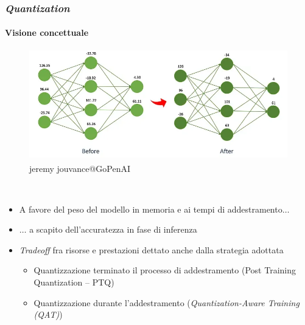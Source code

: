 %
\begin{frame}[t] \frametitle{\emph{Quantization}}
\framesubtitle{Visione concettuale}
{\scriptsize
{}
    \begin{minipage}[t]{\textwidth}
        \vspace*{-.3cm}
        \begin{figure}
            \centering
            \includegraphics[width=.8\textwidth]{img/quantization_concept_no_bg.png}
            \\\textsuperscript{\textcopyright}jeremy jouvance@GoPenAI
        \end{figure}
    \end{minipage}
    \\\vspace*{.3cm}
    \begin{minipage}[t]{\textwidth}
        \begin{itemize}[leftmargin=10pt,align=right]
            \item[\alert{\faArrowCircleRight}] A favore del peso del modello in memoria e ai tempi di addestramento$\ldots$
            \item[\alert{\faArrowCircleRight}] $\ldots$ a scapito dell'accuratezza in fase di inferenza
            \item[\alert{\faArrowCircleRight}]\emph{Tradeoff} fra risorse e prestazioni dettato anche dalla strategia adottata
            \begin{itemize}[leftmargin=10pt,align=right]
                \item[\alert{\faArrowCircleRight}] Quantizzazione terminato il processo di addestramento (\alert{P}ost \alert{T}raining \alert{Q}uantization -- PTQ)
                \item[\alert{\faArrowCircleRight}] Quantizzazione durante l'addestramento (\emph{\alert{Q}uantization-\alert{A}ware \alert{T}raining (QAT)})
            \end{itemize}
        \end{itemize}
    \end{minipage}
}
\end{frame}
